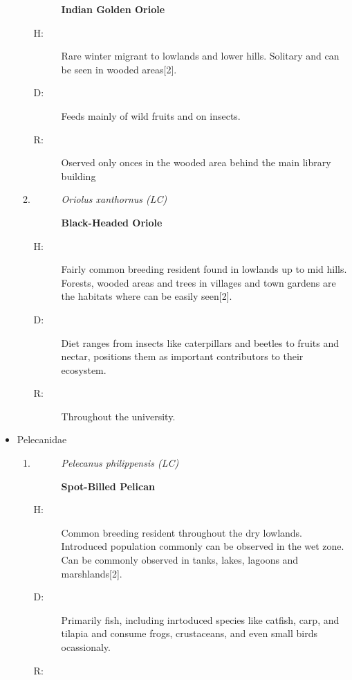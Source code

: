 \begin{itemize}
\begin{enumerate}
\begin{description}
\item[]%
\textbf{Indian Golden Oriole}%
\end{description}%
\begin{description}%
\item[H: ]%
Rare winter migrant to lowlands and lower hills. Solitary and can be seen in wooded areas{[}2{]}.%
\item[D: ]%
Feeds mainly of wild fruits and on insects. %
\item[R: ]%
Oserved only onces in the wooded area behind the main library building%
\end{description}%
\item%
\begin{description}%
\item[]%
\textit{Oriolus xanthornus (LC)}%
\item[]%
\textbf{Black{-}Headed Oriole}%
\end{description}%
\begin{description}%
\item[H: ]%
Fairly common breeding resident found in lowlands up to mid hills. Forests, wooded areas and trees in villages and town gardens are the habitats where can be easily seen{[}2{]}.%
\item[D: ]%
Diet ranges from insects like caterpillars and beetles to fruits and nectar, positions them as important contributors to their ecosystem.%
\item[R: ]%
Throughout the university.%
\end{description}%
\end{enumerate}%
\item%
Pelecanidae%
\begin{enumerate}%
\item%
\begin{description}%
\item[]%
\textit{Pelecanus philippensis (LC)}%
\item[]%
\textbf{Spot{-}Billed Pelican}%
\end{description}%
\begin{description}%
\item[H: ]%
Common breeding resident throughout the dry lowlands. Introduced population commonly can be observed in the wet zone.  Can be commonly observed in tanks, lakes, lagoons and marshlands{[}2{]}.%
\item[D: ]%
Primarily fish, including inrtoduced species like catfish, carp, and tilapia and consume frogs, crustaceans, and even small birds ocassionaly.%
\item[R: ]%

\end{description}
\end{enumerate}
\end{itemize}
